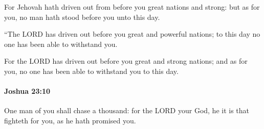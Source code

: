 			\begin{versebox}
					\item[BHS] 
					\item[ASV] For Jehovah hath driven out from before you great nations and strong: but as for you, no man hath stood before you unto this day.
					\item[NIV] “The LORD has driven out before you great and powerful nations; to this day no one has been able to withstand you.
					\item[NRSV] For the LORD has driven out before you great and strong nations; and as for you, no one has been able to withstand you to this day.
			\end{versebox}

		\paragraph{Joshua 23:10} %
			\label{JOSHUA-23-10}

			One man of you shall chase a thousand: for the LORD your God, he it is that fighteth for you, as he hath promised you.


